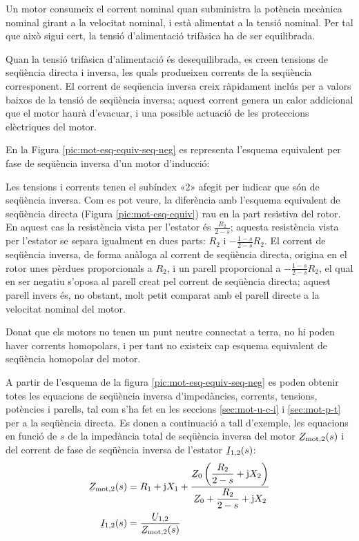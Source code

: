 Un motor consumeix el corrent nominal quan subministra la potència mecànica nominal girant a la velocitat nominal, i està alimentat a la tensió nominal. Per tal que això sigui cert, la tensió d'alimentació trifàsica ha de ser equilibrada.

Quan la tensió trifàsica d'alimentació és desequilibrada, es creen tensions de seqüència directa i inversa, les quals  produeixen corrents de la seqüència corresponent. El corrent de seqüencia inversa creix ràpidament inclús per a valors baixos de  la tensió de seqüència inversa; aquest corrent genera un  calor addicional que el motor haurà d'evacuar, i una possible actuació de les proteccions elèctriques del motor.

En la Figura \vref{pic:mot-esq-equiv-seq-neg} es representa l'esquema equivalent per fase de seqüència inversa d'un   motor d'inducció:

\begin{center}
	
	\label{pic:mot-esq-equiv-seq-neg}
\end{center}

Les tensions i corrents tenen el subíndex «2» afegit per indicar que són de seqüència inversa. Com es pot veure, la diferència amb l'esquema equivalent de seqüència directa (Figura \vref{pic:mot-esq-equiv}) rau en la part resistiva del rotor. En aquest cas la resistència vista per l'estator és $\frac{R_2}{2-s}$; aquesta resistència vista per l'estator se separa igualment en dues parts: $R_2$ i $-\frac{1-s}{2-s} R_2$. El corrent de seqüència inversa, de forma anàloga al corrent de seqüència directa,  origina en el rotor unes pèrdues proporcionals a $R_2$, i un parell proporcional a $-\frac{1-s}{2-s} R_2$, el qual en ser negatiu s'oposa al parell creat pel corrent de seqüència directa; aquest parell invers és, no obstant, molt petit comparat amb el parell directe a la velocitat nominal del motor.

Donat que els motors no tenen un punt neutre connectat a terra, no hi poden haver corrents homopolars, i per tant no existeix cap esquema equivalent de seqüència homopolar del motor.

A partir de l'esquema de la figura \vref{pic:mot-esq-equiv-seq-neg} es poden obtenir totes les equacions de seqüència inversa d'impedàncies, corrents, tensions, potències i parells, tal com s'ha fet en les seccions \ref{sec:mot-u-c-i} i \ref{sec:mot-p-t} per a la seqüència directa. Es donen a continuació a tall d'exemple, les equacions en funció de $s$ de la impedància total de seqüència inversa del motor $\cmplx{Z}\ped{mot,2}(s)$ i del corrent de fase de seqüència inversa de l'estator $\cmplx{I}_{1,2}(s)$:
\begin{align}
	\cmplx{Z}\ped{mot,2}(s) &= R_1 + \ju X_1 + \frac{\cmplx{Z}_0 \left( \dfrac{R_2}{2-s} + \ju X_2\right)}{\cmplx{Z}_0 +  \dfrac{R_2}{2-s} + \ju X_2}\label{eq:mot-Zmot-inv}\\
	\cmplx{I}_{1,2}(s) &= \frac{\cmplx{U}_{1,2}}{\cmplx{Z}\ped{mot,2}(s)}\label{eq:mot-I1-inv}
\end{align}

